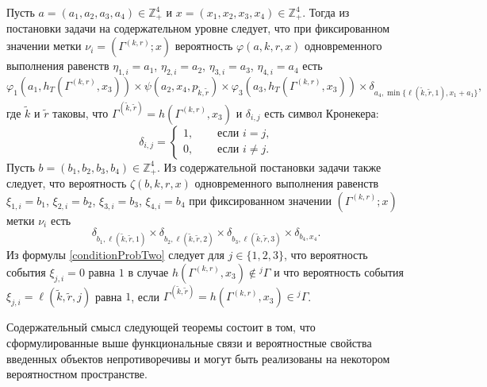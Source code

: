 \documentclass[a4paper,12pt,russian]{extarticle}
\begin{document}
Пусть $a=(a_1, a_2, a_3, a_4) \in \mathbb{Z}_+^4$ и $x=(x_1, x_2, x_3, x_4) \in \mathbb{Z}_+^4$. Тогда из постановки задачи на содержательном уровне следует, что при фиксированном значении метки $\nu_i=(\Gamma^{(k,r)}; x)$ вероятность $\varphi(a,k,r,x)$ одновременного выполнения равенств $\eta_{1,i}=a_1$, $\eta_{2,i}=a_2$, $\eta_{3,i}=a_3$, $\eta_{4,i}=a_4$ есть 
\begin{equation}
\varphi_1(a_1,h_T(\Gamma^{(k,r)},x_3)) \times \psi(a_2,x_4, p_{\tilde{k},\tilde{r}}) \times \varphi_3(a_3,h_T(\Gamma^{(k,r)},x_3))
\times \delta_{a_4,\min{\{\ell(\tilde{k},\tilde{r},1), x_1+a_1}\}},
\label{conditionProbOne}
\end{equation}
где $\tilde{k}$ и $\tilde{r}$ таковы, что $\Gamma^{(\tilde{k},\tilde{r})}=h(\Gamma^{(k,r)},x_3)$ и $\delta_{i,j}$ есть символ Кронекера:
$$
\delta_{i,j}=
\begin{cases} 
1,& \quad \text{ если $i=j$,}\\
0,& \quad \text{ если $i\neq j$.}
\end{cases}
$$%
Пусть $b=(b_1, b_2, b_3, b_4) \in \mathbb{Z}_+^4$. Из содержательной постановки задачи также следует, что вероятность $\zeta(b, k, r, x)$ одновременного выполнения равенств $\xi_{1,i}=b_1$, $\xi_{2,i}=b_2$, $\xi_{3,i}=b_3$, $\xi_{4,i}=b_4$ при фиксированном значении $(\Gamma^{(k,r)}; x)$ метки $\nu_i$ есть
\begin{equation}
\delta_{b_1,\ell(\tilde{k},\tilde{r},1)} \times \delta_{b_2,\ell(\tilde{k},\tilde{r},2)} \times 
\delta_{b_3,\ell(\tilde{k},\tilde{r},3)} \times \delta_{b_4,x_4}.
\label{conditionProbTwo}
\end{equation}
Из формулы \eqref{conditionProbTwo} следует для $j\in \{1, 2, 3\}$, что вероятность события $\xi_{j,i}=0$ равна $1$ в случае $h(\Gamma^{(k,r)},x_3)\notin {}^j\Gamma$ и что вероятность события $\xi_{j,i}=\ell(\tilde{k},\tilde{r},j)$ равна $1$, если $\Gamma^{(\tilde{k},\tilde{r})}=h(\Gamma^{(k,r)},x_3)\in {}^j\Gamma$.


Содержательный смысл следующей теоремы состоит в том, что сформулированные выше функциональные связи и вероятностные свойства введенных объектов непротиворечивы и могут быть реализованы на некотором вероятностном пространстве.
\end{document}
